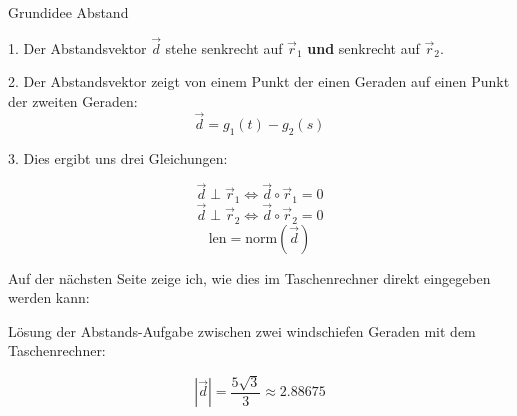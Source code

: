 \begin{rezept}{Grundidee Abstand}{}

  1. Der Abstandsvektor $\vec{d}$ stehe senkrecht auf $\vec{r}_1$
  \textbf{und} senkrecht auf $\vec{r}_2$.

  2. Der Abstandsvektor zeigt von einem Punkt der einen Geraden auf
  einen Punkt der zweiten Geraden: $$\vec{d}=g_1(t)-g_2(s)$$

  3. Dies ergibt uns drei Gleichungen:

  $$\vec{d}\perp\vec{r}_1 \Longleftrightarrow{}  \vec{d}\circ{}\vec{r}_1 = 0$$
  $$\vec{d}\perp\vec{r}_2 \Longleftrightarrow{}  \vec{d}\circ{}\vec{r}_2 = 0$$
  $$\text{len} = \text{norm}(\vec{d})$$
  
\end{rezept}

Auf der nächsten Seite zeige ich, wie dies im Taschenrechner direkt
eingegeben werden kann:
\newpage

Lösung der Abstands-Aufgabe zwischen zwei windschiefen Geraden mit dem
Taschenrechner:
\TRAINER{}


$$|\vec{d}| = \frac{5\sqrt{3}}{3} \approx 2.88675$$
\newpage

